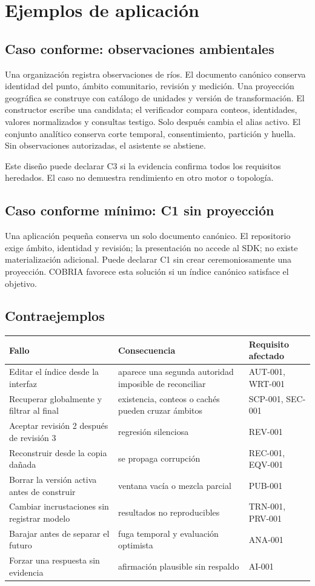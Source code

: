 \documentclass[11pt,letterpaper]{article}
\begin{document}
\section{Ejemplos de aplicación}
\subsection{Caso conforme: observaciones ambientales}
Una organización registra observaciones de ríos. El documento canónico conserva
identidad del punto, ámbito comunitario, revisión y medición. Una proyección geográfica
se construye con catálogo de unidades y versión de transformación. El constructor escribe
una candidata; el verificador compara conteos, identidades, valores normalizados y
consultas testigo. Solo después cambia el alias activo. El conjunto analítico conserva
corte temporal, consentimiento, partición y huella. Sin observaciones autorizadas, el
asistente se abstiene.

Este diseño puede declarar C3 si la evidencia confirma todos los requisitos heredados.
El caso no demuestra rendimiento en otro motor o topología.

\subsection{Caso conforme mínimo: C1 sin proyección}
Una aplicación pequeña conserva un solo documento canónico. El repositorio exige ámbito,
identidad y revisión; la presentación no accede al SDK; no existe materialización
adicional. Puede declarar C1 sin crear ceremoniosamente una proyección. COBRIA favorece
esta solución si un índice canónico satisface el objetivo.

\subsection{Contraejemplos}
\begin{longtable}{p{.24\linewidth}p{.31\linewidth}p{.37\linewidth}}
\toprule Fallo & Consecuencia & Requisito afectado \\ \midrule
Editar el índice desde la interfaz & aparece una segunda autoridad imposible de reconciliar & AUT-001, WRT-001 \\
Recuperar globalmente y filtrar al final & existencia, conteos o cachés pueden cruzar ámbitos & SCP-001, SEC-001 \\
Aceptar revisión 2 después de revisión 3 & regresión silenciosa & REV-001 \\
Reconstruir desde la copia dañada & se propaga corrupción & REC-001, EQV-001 \\
Borrar la versión activa antes de construir & ventana vacía o mezcla parcial & PUB-001 \\
Cambiar incrustaciones sin registrar modelo & resultados no reproducibles & TRN-001, PRV-001 \\
Barajar antes de separar el futuro & fuga temporal y evaluación optimista & ANA-001 \\
Forzar una respuesta sin evidencia & afirmación plausible sin respaldo & AI-001 \\ \bottomrule
\end{longtable}
\end{document}
